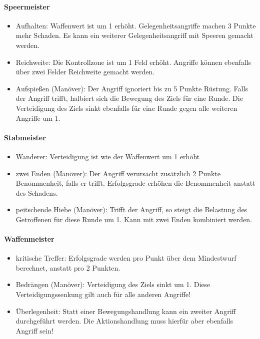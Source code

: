 \documentclass{article}
\begin{document}
\paragraph{Speermeister}

\begin{itemize}
\item Aufhalten: Waffenwert ist um 1 erhöht. Gelegenheitsangriffe machen 3 Punkte mehr Schaden. Es kann ein weiterer Gelegenheitsangriff mit Speeren gemacht werden.
\item Reichweite: Die Kontrollzone ist um 1 Feld erhöht. Angriffe können ebenfalls über zwei Felder Reichweite gemacht werden.
\item Aufspießen (Manöver): Der Angriff ignoriert bis zu 5 Punkte Rüstung. Falls der Angriff trifft, halbiert sich die Bewegung des Ziels für eine Runde. Die Verteidigung des Ziels sinkt ebenfalls für eine Runde gegen alle weiteren Angriffe um 1.
\end{itemize}

\paragraph{Stabmeister}

\begin{itemize}
\item Wanderer: Verteidigung ist wie der Waffenwert um 1 erhöht
\item zwei Enden (Manöver): Der Angriff verursacht zusätzlich 2 Punkte Benommenheit, falls er trifft. Erfolgsgrade erhöhen die Benommenheit anstatt des Schadens.
\item peitschende Hiebe (Manöver): Trifft der Angriff, so steigt die Belastung des Getroffenen für diese Runde um 1. Kann mit zwei Enden kombiniert werden.
\end{itemize}

\paragraph{Waffenmeister}

\begin{itemize}
\item kritische Treffer: Erfolgsgrade werden pro Punkt über dem Mindestwurf berechnet, anstatt pro 2 Punkten.
\item Bedrängen (Manöver): Verteidigung des Ziels sinkt um 1. Diese Verteidigungssenkung gilt auch für alle anderen Angriffe!
\item Überlegenheit: Statt einer Bewegungshandlung kann ein zweiter Angriff durchgeführt werden. Die Aktionshandlung muss hierfür aber ebenfalls Angriff sein!
\end{itemize}
\end{document}
